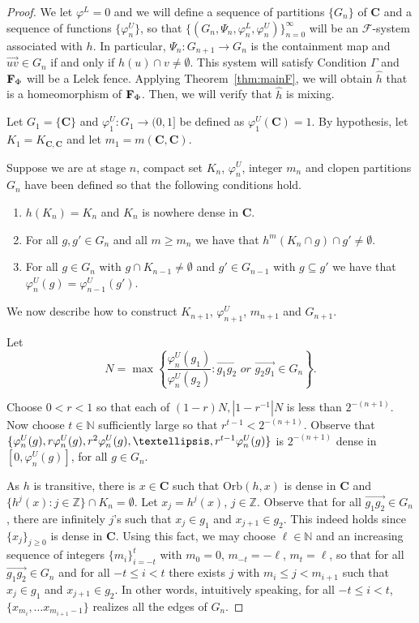 \documentclass[10pt,a4paper]{amsart}
\newcommand{\N}{\mathbb{N}}  %
\newcommand{\Z}{\mathbb{Z}}  %
\newcommand{\cF}{\mathcal{F}}
\newcommand{\cantor}{\mathbf C}
\newcommand{\fence}{{\bf F}_{\Phi}{}}
\newcommand{\fsystem}{\{(G_n, \Psi_n,\varphi^L_n,\varphi^U_n)\}_{n=0}^{\infty}}
\newcommand{\oa}{\overrightarrow}
\newcommand{\orb}{{\mathrm{Orb}}}
\begin{document}
\begin{proof}
We let $\varphi^L=0$ and 
    we will define a sequence of partitions $\{G_n\}$  of $\cantor$ and a sequence of functions $\{\varphi^U_n\}$, so that $\fsystem$ will be an  $\cF$-system associated with $h$. In particular, $
    \Psi_n:G_{n+1} \rightarrow G_n$ is the  containment map and $ \oa{uv} \in G_n$ if and only if $h(u) \cap v \neq \emptyset$.  This system will satisfy Condition $\Gamma$ and $\fence$ will be a Lelek fence. Applying Theorem~\ref{thm:mainF}, we will obtain $\hat h$ that is a homeomorphism of $\fence$. Then, we will verify that $\hat{h}$ is mixing.

     Let $G_1= \{\cantor\}$ and $\varphi^U_1:G_1 \rightarrow (0,1]$ be defined as $\varphi^U_1(\cantor) =1$. By hypothesis, let $K_1=K_{\cantor,\cantor}$ and let $m_1 = m(\cantor,\cantor)$.
     
Suppose we are at stage $n$,  compact set $K_n$, $\varphi^U_{n}$, integer $m_n$ and  clopen partitions $G_n$  have been defined so that the following conditions hold.
        \begin{enumerate}[label=(\alph*)]
            \item $h(K_n) = K_n$ and $K_n$ is nowhere dense in $\cantor$.
    \item For all $g, g' \in G_n$ and all $m \ge m_n$ we have that $h^m(K_n \cap g ) \cap g' \neq \emptyset$.
    \item  For all $ g\in G_n$  with $g \cap K_{n-1}  \neq \emptyset$ and $g' \in G_{n-1}$ with $g \subseteq g'$ we have that  $ \varphi^U_{n}(g)= \varphi^U_{n-1}(g')$.
        \end{enumerate}

        We now describe how to construct $K_{n+1}$, $\varphi^U_{n+1}$, $m_{n+1}$ and $G_{n+1}$. 

    
  Let \[  N =  \max  \left \{ \frac{\varphi^U_n(g_1)}{\varphi^U_n(g_2)}: \oa{g_1g_2} \textit { or } \oa{g_2g_1} \in G_n \right \}.\]
    
    Choose $0 < r <1$ so that each of $(1-r)N, |1-r^{-1}|N$ is less than $2^{-(n+1)}$. Now choose $ t \in \N$ sufficiently large so that $r^{t-1}< 2^{-(n+1)}$. Observe that  $\{\varphi^U_n(g), r\varphi^U_n(g), r^2 \varphi^U_n(g), \ldots,\\
    r^{t-1} \varphi^U_n(g)\}$ is $2^{-(n+1)}$ dense in $[0, \varphi^U_n(g)]$, for all $g \in G_n$.

As $h$ is transitive, there is $x \in \cantor$ such that $\orb(h,x)$ is dense in $\cantor$ and  $\{h^j(x): j \in \Z \} \cap K_n = \emptyset$. Let $x_j = h^j(x)$, $j \in \Z$.
Observe that for all $\oa{g_1g_2} \in G_n$, there are infinitely $j$'s  such that $x_j \in g_1$ and $x_{j+1} \in g_2$. This indeed holds since $\{x_j\}_{j \ge 0}$ is dense in $\cantor$. Using this fact, we may choose $\ell\in \N$ and an increasing sequence of integers $\{m_i\}_{i=-t}^t$ with $m_0 =0$,   $m_{-t} = -\ell$, $m_t = \ell$,  so that for all    $\oa{g_1g_2} \in G_n$ and for all $-t \le i < t$  there exists $j$ with $m_i \le j < m_{i+1}$ such that $x_j \in g_1$ and $x_{j+1} \in g_2$. In other words, intuitively speaking, for all $-t \le i < t$, $\{x_{m_i}, \ldots x_{m_{i+1}-1}\}$ realizes all the edges of $G_n$.
     

\end{proof}
\end{document}
